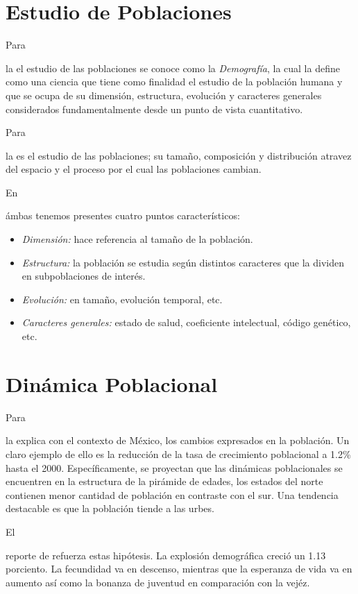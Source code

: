 \documentclass[stu, 12pt, letterpaper, donotrepeattitle, floatsintext, natbib]{apa7}
\begin{document}
\section{Estudio de Poblaciones}
Para \begin{justifying}
    la \cite{unknown-author-no-dateA} %
    el estudio de las poblaciones se conoce como la \emph{Demografía}, la cual la define como una ciencia
    que tiene como finalidad el estudio de la población humana y que se ocupa de su dimensión, estructura, evolución
    y caracteres generales considerados fundamentalmente desde un punto de vista cuantitativo.\par
\end{justifying}
Para \begin{justifying}
    la \cite{unknown-author-no-dateB} %
    es el estudio de las poblaciones; su tamaño, composición y distribución atravez del espacio y el proceso por el cual
    las poblaciones cambian.\par
\end{justifying}
En \begin{justifying}
    ámbas tenemos presentes cuatro puntos característicos:
    \begin{itemize}
        \item \emph{Dimensión:} hace referencia al tamaño de la población.
        \item \emph{Estructura:} la población se estudia según distintos caracteres que la dividen en subpoblaciones de interés.
        \item \emph{Evolución:} en tamaño, evolución temporal, etc.
        \item \emph{Caracteres generales:} estado de salud, coeficiente intelectual, código genético, etc.
    \end{itemize}\par
\end{justifying}
\vspace{\baselineskip}
\section{Dinámica Poblacional}
Para \begin{justifying}
    la \cite{unknown-author-no-dateC} %
    explica con el contexto de México, los cambios expresados en la población. Un claro ejemplo de ello es la reducción de la tasa de crecimiento
    poblacional a 1.2\% hasta el 2000. Específicamente, se proyectan que las dinámicas poblacionales se encuentren en la estructura de la pirámide
    de edades, los estados del norte contienen menor cantidad de población en contraste con el sur. Una tendencia destacable es que la población tiende 
    a las urbes.\par
\end{justifying}
El \begin{justifying}
    reporte de \cite{conapo-2013} refuerza estas hipótesis. La explosión demográfica creció un 1.13 porciento. La fecundidad va en descenso, mientras que la
    esperanza de vida va en aumento así como la bonanza de juventud en comparación con la vejéz.\par 
\end{justifying}
\end{document}
